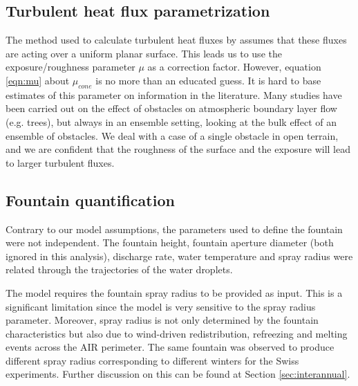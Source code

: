 \subsection{Turbulent heat flux parametrization}


The method used to calculate turbulent heat fluxes by \citet{garrattAtmosphericBoundaryLayer1992} assumes that
these fluxes are acting over a uniform planar surface. This leads us to use the exposure/roughness parameter
$\mu$ as a correction factor. However, equation \ref{eqn:mu} about $\mu_{cone}$ is no more than an educated guess. It
is hard to base estimates of this parameter on information in the literature. Many studies have been carried out
on the effect of obstacles on atmospheric boundary layer flow (e.g. trees), but always in an ensemble setting,
looking at the bulk effect of an ensemble of obstacles. We deal with a case of a single obstacle in open
terrain, and we are confident that the roughness of the surface and the exposure will lead to larger turbulent
fluxes.

\subsection{Fountain quantification}

Contrary to our model assumptions, the parameters used to define the fountain were not independent. The fountain
height, fountain aperture diameter (both ignored in this analysis), discharge rate, water temperature and spray
radius were related through the trajectories of the water droplets.

The model requires the fountain spray radius to be provided as input. This is a significant limitation since the
model is very sensitive to the spray radius parameter. Moreover, spray radius is not only determined by the fountain
characteristics but also due to wind-driven redistribution, refreezing and melting events across the AIR
perimeter. The same fountain was observed to produce different spray radius corresponding to different winters
for the Swiss experiments. Further discussion on this can be found at Section \ref{sec:interannual}.



